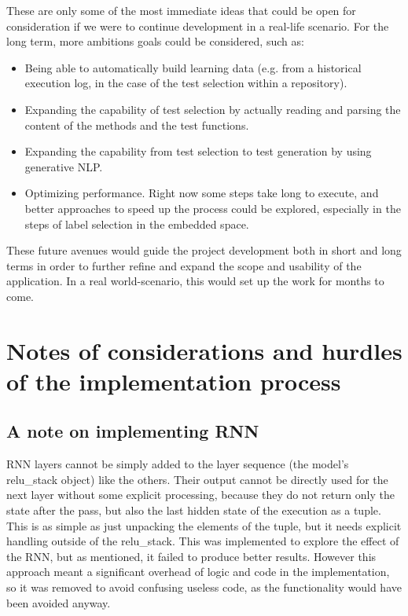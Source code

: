 \documentclass[a4paper, 11pt]{report}
\begin{document}
    These are only some of the most immediate ideas that could be open for consideration if we were to continue development in a real-life scenario. For the long term, more ambitions goals could be considered, such as:
    \begin{itemize}
        \item Being able to automatically build learning data (e.g. from a historical execution log, in the case of the test selection within a repository).
        \item Expanding the capability of test selection by actually reading and parsing the content of the methods and the test functions.
        \item Expanding the capability from test selection to test generation by using generative NLP.
        \item Optimizing performance. Right now some steps take long to execute, and better approaches to speed up the process could be explored, especially in the steps of label selection in the embedded space.
    \end{itemize}

    These future avenues would guide the project development both in short and long terms in order to further refine and expand the scope and usability of the application. In a real world-scenario, this would set up the work for months to come.

\printbibliography[heading=bibintoc, title={Bibliography}]

\appendix

\chapter{Notes of considerations and hurdles of the implementation process}
\section{A note on implementing RNN}\label{Apx: A note on implementing RNN}
    RNN layers cannot be simply added to the layer sequence (the model's relu\_stack object) like the others. Their output cannot be directly used for the next layer without some explicit processing, because they do not return only the state after the pass, but also the last hidden state of the execution as a tuple. This is as simple as just unpacking the elements of the tuple, but it needs explicit handling outside of the relu\_stack. This was implemented to explore the effect of the RNN, but as mentioned, it failed to produce better results. However this approach meant a significant overhead of logic and code in the implementation, so it was removed to avoid confusing useless code, as the functionality would have been avoided anyway.
\end{document}

